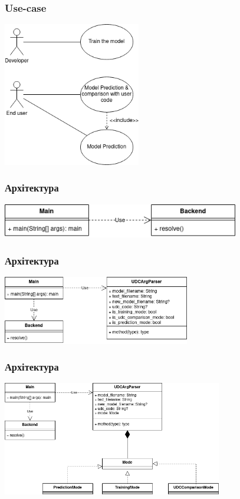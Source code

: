\documentclass{beamer}
\begin{document}
\begin{frame}
\frametitle{Use-case}

\begin{center}
	\includegraphics[width=6cm]{use-case.drawio.png}
\end{center}

\end{frame}


\begin{frame}
\frametitle{Архітектура}
\begin{center}
	\includegraphics[height=1.5cm]{io_uml1.drawio.png}
\end{center}
\end{frame}

\begin{frame}
	\frametitle{Архітектура}
	\begin{center}
		\includegraphics[height=3cm]{io_uml2.drawio.png}
	\end{center}
\end{frame}

\begin{frame}
	\frametitle{Архітектура}
	\begin{center}
		\includegraphics[height=5cm]{io_uml3.drawio.png}
	\end{center}
\end{frame}
\end{document}
